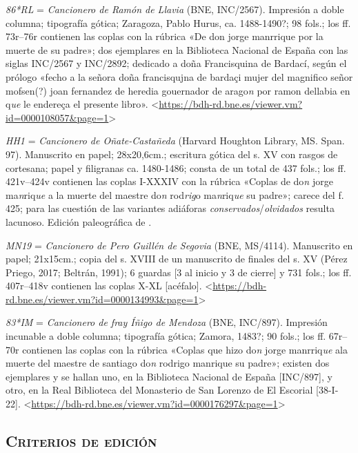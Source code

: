 \documentclass[11pt,a4paper,twoside]{article}
\newcommand{\comillas}[1]{«#1»}
\newcommand{\rl}{\emph{86*RL}}
\newcommand{\hh}{\emph{HH1}}
\newcommand{\mn}{\emph{MN19}}
\newcommand{\im}{\emph{83*IM}}
\begin{document}
{\rl} = \emph{Cancionero de Ramón de Llavia} (BNE, INC/2567).
%
Impresión a doble columna; tipografía gótica; Zaragoza, Pablo Hurus, ca. 1488-1490?; 98 fols.; los ff. 73r--76r contienen las coplas con la rúbrica \comillas{De don jorge manrrique por la muerte de su padre}; dos ejemplares en la Biblioteca Nacional de España con las siglas INC/2567 y INC/2892; dedicado a doña Francisquina de Bardací, según el prólogo \comillas{fecho a la señora doña francisqujna de bardaçi mujer del magnifico señor mofsen(?) joan fernandez de heredia gouernador de arago\emph{n} por ramon dellabia en q\emph{ue} le endereça el presente libro}. <\url{https://bdh-rd.bne.es/viewer.vm?id=0000108057&page=1}>\par

{\hh} = \emph{Cancionero de Oñate-Castañeda} (Harvard Houghton Library, MS. Span. 97).
%
Manuscrito en papel; 28x20,6cm.; escritura gótica del s. XV con rasgos de cortesana; papel y filigranas ca. 1480-1486; consta de un total de 437 fols.; los ff. 421v--424v contienen las coplas I-XXXIV con la rúbrica \comillas{Coplas de do\emph{n} jorge ma\emph{n}riq\emph{ue} a la muerte del maestre do\emph{n} rod\emph{rig}o ma\emph{n}riq\emph{ue} su padre}; carece del f. 425; para las cuestión de las variantes adiáforas \emph{conservados}/\emph{olvidados} resulta lacunoso. Edición paleográfica de \textcite{Severin1990}.\par

{\mn} = \emph{Cancionero de Pero Guillén de Segovia} (BNE, MS/4114).
%
Manuscrito en papel; 21x15cm.; copia del s. XVIII de un manuscrito de finales del s. XV (Pérez Priego, 2017; Beltrán, 1991); 6 guardas [3 al inicio y 3 de cierre] y 731 fols.; los ff. 407r--418v contienen las coplas X-XL [acéfalo]. <\url{https://bdh-rd.bne.es/viewer.vm?id=0000134993&page=1}>\par

{\im} = \emph{Cancionero de fray Íñigo de Mendoza} (BNE, INC/897).
%
Impresión incunable a doble columna; tipografía gótica; Zamora, 1483?; 90 fols.; los ff. 67r--70r contienen las coplas con la rúbrica \comillas{Coplas que hizo do\emph{n} jorge manrriq\emph{ue} ala muerte del maestre de santiago do\emph{n} rodrigo manrique su padre}; existen dos ejemplares y se hallan uno, en la Biblioteca Nacional de España [INC/897], y otro, en la Real Biblioteca del Monasterio de San Lorenzo de El Escorial [38-I-22]. <\url{https://bdh-rd.bne.es/viewer.vm?id=0000176297&page=1}>\par
\relax
\vfill

\subsection*{\centering\normalsize \textsc{Criterios de edición}}
\end{document}
